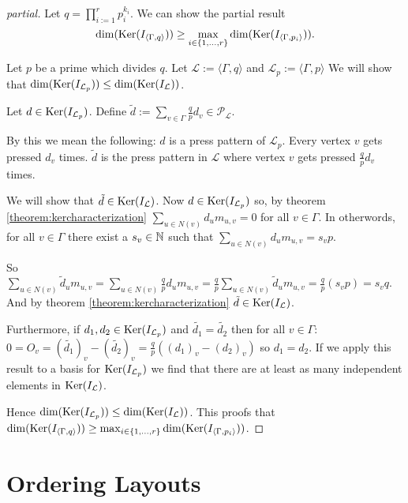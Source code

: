 \begin{proof}[partial]
	Let $q=\prod_{i:=1}^{r} p_{i}^{k_{i}}$. We can show the partial result
	\[
		\dim(\operatorname{Ker}(I_{\langle\Gamma,q\rangle})) \ge \max_{i\in \{1,\ldots,r\}} \dim(\operatorname{Ker}(I_{\langle\Gamma,p_{i}\rangle})).
	\]
	
	Let $p$ be a prime which divides $q$. Let $\mathcal{L} := \langle
	\Gamma, q \rangle$ and $\mathcal{L}_{p} := \langle \Gamma, p \rangle$ We
	will show that $\dim( \operatorname{Ker}( I_{\mathcal{L}_{p}} ) ) \le \dim(
	\operatorname{Ker}( I_{\mathcal{L}} ) )$.
	
	Let $d \in \operatorname{Ker}( I_{\mathcal{L}_{p}} )$. Define $\tilde{d}
	:= \sum_{v \in \Gamma} \frac{q}{p} d_{v} \in
	\mathcal{P}_{\mathcal{L}}$. 
	
	By this we mean the following: $d$ is a press pattern of
	$\mathcal{L}_{p}$. Every vertex $v$ gets pressed $d_{v}$ times.
	$\tilde{d}$ is the press pattern in $\mathcal{L}$ where vertex $v$ gets
	pressed $\frac{q}{p}d_{v}$ times.
		
	We will show that $\tilde{d} \in \operatorname{Ker}( I_{\mathcal{L}} )$. Now
	$d \in \operatorname{Ker}( I_{\mathcal{L}_{p}} )$ so, by theorem
	\ref{theorem:kercharacterization} $\sum_{u\in N(v)} d_{u} m_{u,v} = 0$
	for all $v\in\Gamma$. In otherwords, for all $v\in\Gamma$ there exist a
	$s_{v}\in\mathbb{N}$ such that $\sum_{u\in N(v)} d_{u} m_{u,v} = s_{v}p$.
	
	So $\sum_{u\in N(v)} \tilde{d}_{u} m_{u,v} = \sum_{u\in N(v)}
	\frac{q}{p} d_{u} m_{u,v} = \frac{q}{p} \sum_{u\in N(v)} \tilde{d}_{u}
	m_{u,v} = \frac{q}{p} (s_{v}p) = s_{v}q$. And by theorem
	\ref{theorem:kercharacterization} $\tilde{d} \in \operatorname{Ker}( I_{\mathcal{L}}
	)$.
	
	Furthermore, if $d_{1},d_{2}\in \operatorname{Ker}( I_{\mathcal{L}_{p}})$ and
	$\tilde{d_{1}} = \tilde{d_{2}}$ then for all $v\in\Gamma$: $0 = O_{v} =
	(\tilde{d_{1}})_{v} - (\tilde{d_{2}})_{v} = \frac{q}{p}((d_{1})_{v} -
	(d_{2})_{v})$ so $d_{1} = d_{2}$. If we apply this result to a basis for
	$\operatorname{Ker}( I_{\mathcal{L}_{p}} )$ we find that there are at least as many
	independent elements in $\operatorname{Ker}( I_{\mathcal{L}} )$.
	
	Hence $\dim( \operatorname{Ker}( I_{\mathcal{L}_{p}} ) ) \le \dim(
	\operatorname{Ker}( I_{\mathcal{L}} ) )$. This proofs that
	$\dim(\operatorname{Ker}(I_{\langle\Gamma,q\rangle})) \ge \max_{i\in \{1,\ldots,r\}}
	\dim(\operatorname{Ker}(I_{\langle\Gamma,p_{i}\rangle}))$.
\end{proof}


\section{Ordering Layouts}

